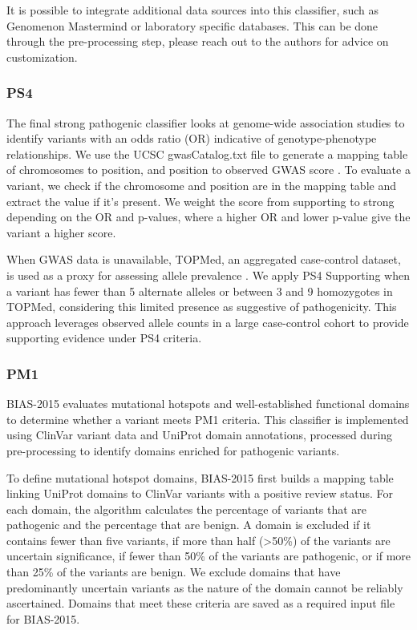 \documentclass[unnumsec,webpdf,contemporary,large]{oup-authoring-template}
\theoremstyle{thmstyleone}
\theoremstyle{thmstyletwo}
\theoremstyle{thmstylethree}
\begin{document}
It is possible to integrate additional data sources into this classifier, such as Genomenon Mastermind\cite{chunn2020mastermind} or laboratory specific databases. This can be done through the pre-processing step, please reach out to the authors for advice on customization. 

\subsubsection{PS4}
The final strong pathogenic classifier looks at genome-wide association studies to identify variants with an odds ratio (OR) indicative of genotype-phenotype relationships. We use the UCSC gwasCatalog.txt file to generate a mapping table of chromosomes to position, and position to observed GWAS score \cite{hindorff2009gwascatalog}. To evaluate a variant, we check if the chromosome and position are in the mapping table and extract the value if it’s present. We weight the score from supporting to strong depending on the OR and p-values, where a higher OR and lower p-value give the variant a higher score. 

 When GWAS data is unavailable, TOPMed, an aggregated case-control dataset, is used as a proxy for assessing allele prevalence \cite{kowalski2019topmed}. We apply PS4 Supporting when a variant has fewer than 5 alternate alleles or between 3 and 9 homozygotes in TOPMed, considering this limited presence as suggestive of pathogenicity. This approach leverages observed allele counts in a large case-control cohort to provide supporting evidence under PS4 criteria.

\subsubsection{PM1}
BIAS-2015 evaluates mutational hotspots and well-established functional domains to determine whether a variant meets PM1 criteria. This classifier is implemented using ClinVar variant data and UniProt domain annotations, processed during pre-processing to identify domains enriched for pathogenic variants\cite{uniprot2012}.

To define mutational hotspot domains, BIAS-2015 first builds a mapping table linking UniProt domains to ClinVar variants with a positive review status. For each domain, the algorithm calculates the percentage of variants that are pathogenic and the percentage that are benign. A domain is excluded if it contains fewer than five variants, if more than half (\textgreater 50\%) of the variants are uncertain significance, if fewer than 50\% of the variants are pathogenic, or if more than 25\% of the variants are benign.  We exclude domains that have predominantly uncertain variants as the nature of the domain cannot be reliably ascertained. Domains that meet these criteria are saved as a required input file for BIAS-2015.
\end{document}
